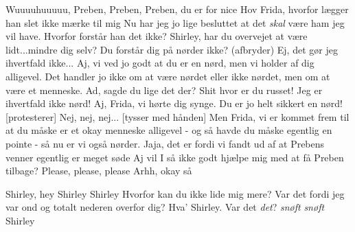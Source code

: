 \documentclass[a4paper,11pt]{article}
\begin{document}
\begin{sketch}
   Wuuuuhuuuuu, Preben, Preben, Preben, du er for nice
   Hov Frida, hvorfor lægger han slet ikke mærke til mig
   Nu har jeg jo lige besluttet at det \emph{skal} være ham jeg vil have. Hvorfor forstår han det ikke?
   Shirley, har du overvejet at være lidt...mindre dig selv?
   Du forstår dig på nørder ikke?
   (afbryder) Ej, det gør jeg ihvertfald ikke...
   Aj, vi ved jo godt at du er en nørd, men vi holder af dig alligevel. Det handler jo ikke om at være nørdet eller ikke nørdet, men om at være et menneske.
   Ad, sagde du lige det der? Shit hvor er du russet! Jeg er ihvertfald ikke nørd!
   Aj, Frida, vi hørte dig synge. Du er jo helt sikkert en nørd!
   [protesterer] Nej, nej, nej...
   [tysser med hånden] Men Frida, vi er kommet frem til at du måske er et okay menneske alligevel - og så havde du måske egentlig en pointe - så nu er vi også nørder.
   Jaja, det er fordi vi fandt ud af at Prebens venner egentlig er meget søde 
   Aj vil I så ikke godt hjælpe mig med at få Preben tilbage?
   Please, please, please
   Arhh, okay så

   Shirley, hey Shirley
   Shirley
   Hvorfor kan du ikke lide mig mere? Var det fordi jeg var ond og totalt nederen overfor dig?
   Hva' Shirley. Var det \emph{det}?
   \emph{snøft} \emph{snøft}
   Shirley

\end{sketch}
\end{document}
